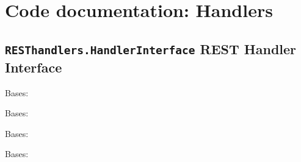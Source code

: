 \documentclass[letterpaper,10pt,english]{sphinxmanual}
\begin{document}
\chapter{Code documentation: Handlers}
\label{hand:code-documentation-handlers}\label{hand::doc}

\section{\texttt{RESThandlers.HandlerInterface} REST Handler Interface}
\label{handler/interface:resthandlers-handlerinterface-rest-handler-interface}\label{handler/interface::doc}\label{handler/interface:module-RESThandlers.HandlerInterface.Exceptions}\label{handler/interface:module-Handlers.Interface.Exceptions}

\begin{fulllineitems}
\label{handler/interface:RESThandlers.HandlerInterface.Exceptions.CollectionNotInstalled}
Bases: 

\end{fulllineitems}


\begin{fulllineitems}
\label{handler/interface:RESThandlers.HandlerInterface.Exceptions.GenericDBError}
Bases: 

\end{fulllineitems}


\begin{fulllineitems}
\label{handler/interface:RESThandlers.HandlerInterface.Exceptions.MultipleObjectsFound}
Bases: 

\end{fulllineitems}


\begin{fulllineitems}
\label{handler/interface:RESThandlers.HandlerInterface.Exceptions.ObjectNotFound}
Bases: 

\end{fulllineitems}
\end{document}
